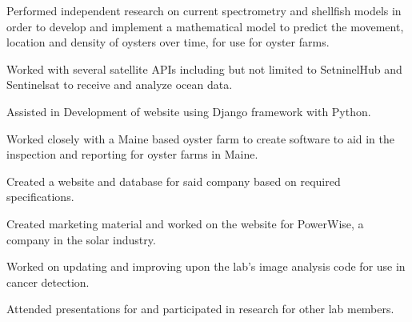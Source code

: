 \documentclass[letterpaper]{AMcEnaneyResume} %
\begin{document}
\begin{minipage}[t]{0.66\textwidth}
        \begin{tightitemize}
            \item Performed independent research on current spectrometry and shellfish models in order to develop and implement a mathematical model to predict the movement, location and density of oysters over time, for use for oyster farms.
            \item Worked with several satellite APIs including but not limited to SetninelHub and Sentinelsat to receive and analyze ocean data.
            \item Assisted in Development of website using Django framework with Python.
        \end{tightitemize}

        \sectionspace %



        \begin{tightitemize}
            \item Worked closely with a Maine based oyster farm to create software to aid in the inspection and reporting for oyster farms in Maine.
            \item Created a website and database for said company based on required specifications.
            \item Created marketing material and worked on the website for PowerWise, a company in the solar industry.
        \end{tightitemize}

        \sectionspace %



        \begin{tightitemize}
            \item Worked on updating and improving upon the lab's image analysis code for use in cancer detection.
            \item Attended presentations for and participated in research for other lab members.
        \end{tightitemize}


\end{minipage}
\end{document}
